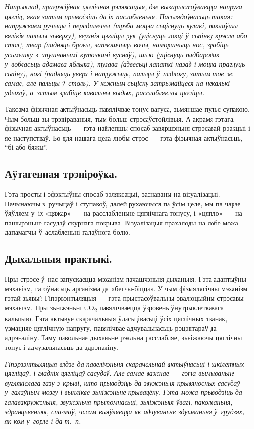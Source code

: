 \emph{Напрыклад, прагрэсіўная цяглічная рэляксацыя, дзе выкарыстоўваецца напруга цягліц, якая затым прыводзіць да іх паслабленьня. Пасьлядоўнасьць такая: напружваем ручыцы і перадплеччы (трэба моцна сьціснуць кулакі, паклаўшы вялікія пальцы зьверху), верхнія цягліцы рук (уціснуць локці ў~сьпінку крэсла або стол), твар (падняць бровы, заплюшчыць вочы, наморшчыць нос, зрабіць усьмешку з~апушчанымі куточкамі вуснаў), шыю (уціснуць падбародак у~вобласьць адамава яблыка), тулава (адвесьці лапаткі назад і моцна прагнуць сьпіну), ногі (падняць уверх і напружыць, пальцы ў~падлогу, затым тое ж самае, але пальцы ў~столь). У кожным сьціску затрымайцеся на некалькі удыхаў, а~затым зрабіце павольны выдых, расслабляючы цягліцы.}

Таксама фізычная актыўнасьць павялічвае тонус вагуса, зьмяншае пульс супакою. Чым больш вы трэніраваныя, тым больш стрэсаўстойлівыя. А акрамя гэтага, фізычная актыўнасьць~--- гэта найлепшы спосаб завяршэньня стрэсавай рэакцыі і яе наступстваў. Бо для нашага цела любы стрэс~--- гэта фізычная актыўнасьць, ``бі або бяжы''.

\subsection*{Аўтагенная трэніроўка.}

Гэта просты і эфэктыўны спосаб рэляксацыі, заснаваны на візуалізацыі. Пачынаючы з~ручыцаў і ступакоў, далей рухаючыся па ўсім целе, мы па чарзе ўяўляем у~іх «цяжар»~--- на расслабленьне цяглічнага тонусу, і «цяпло»~--- на пашырэньне сасудаў скурнага покрыва. Візуалізацыя прахалоды на лобе можа дапамагчы ў~аслабленьні галаўнога болю.

\subsection*{Дыхальныя практыкі.}

Пры стрэсе ў~нас запускаецца мэханізм пачашчэньня дыханьня. Гэта адаптыўны мэханізм, гатоўнасьць арганізма да «бегчы-біцца». У чым фізыялягічны мэханізм гэтай зьявы? Гіпэрвэнтыляцыя~--- гэта прыстасоўвальны эвалюцыйны стрэсавы мэханізм. Пры зьніжэньні CO\textsubscript{2} павялічваецца ўзровень ўнутрыклеткавага кальцыю. Гэта актывуе скарачальныя ўласьцівасьці ўсіх цяглічных тканак, узмацняе цяглічную напругу, павялічвае адчувальнасьць рэцэптараў да адрэналіну. Таму павольнае дыханьне рэальна расслабляе, зьніжаючы цяглічны тонус і адчувальнасьць да адрэналіну.

\emph{Гіпэрвэнтыляцыя вядзе да павелічэньня скарачальнай актыўнасьці і шкілетных цягліцаў, і гладкіх цягліцаў сасудаў. Але самае важнае~--- гэта вымываньне вуглякіслага газу з~крыві, што прыводзіць да звужэньня крывяносных сасудаў у~галаўным мозгу і выклікае зьніжэньне крывацёку. Гэта можа прыводзіць да галавакружэньня, звужэньня прытомнасьці, зьніжэньня ўвагі, паколваньня, здранцьвеньня, спазмаў, часам выяўляецца як адчуваньне здушваньня ў~грудзях, як ком у~горле і да т.~п.}

